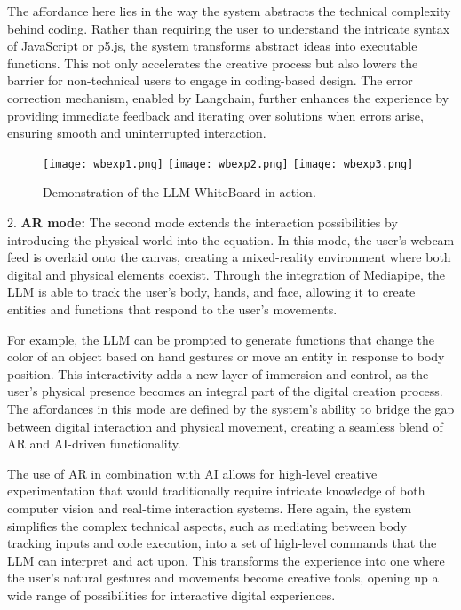 The affordance here lies in the way the system abstracts the technical complexity behind coding.
Rather than requiring the user to understand the intricate syntax of JavaScript or p5.js, the system transforms abstract ideas into executable functions.
This not only accelerates the creative process but also lowers the barrier for non-technical users to engage in coding-based design.
The error correction mechanism, enabled by Langchain, further enhances the experience by providing immediate feedback and iterating over solutions when errors arise, ensuring smooth and uninterrupted interaction.

\begin{figure}[h!]
    \centering
    \texttt{[image: wbexp1.png]}
    \texttt{[image: wbexp2.png]}
    \texttt{[image: wbexp3.png]}
    \caption{Demonstration of the LLM WhiteBoard in action.}
    \vspace{0.1cm}
    \label{fig:wbdemo1}
\end{figure}

2. \textbf{AR mode:} The second mode extends the interaction possibilities by introducing the physical world into the equation.
In this mode, the user’s webcam feed is overlaid onto the canvas, creating a mixed-reality environment where both digital and physical elements coexist.
Through the integration of Mediapipe, the LLM is able to track the user’s body, hands, and face, allowing it to create entities and functions that respond to the user’s movements.

For example, the LLM can be prompted to generate functions that change the color of an object based on hand gestures or move an entity in response to body position.
This interactivity adds a new layer of immersion and control, as the user's physical presence becomes an integral part of the digital creation process.
The affordances in this mode are defined by the system’s ability to bridge the gap between digital interaction and physical movement, creating a seamless blend of AR and AI-driven functionality.

The use of AR in combination with AI allows for high-level creative experimentation that would traditionally require intricate knowledge of both computer vision and real-time interaction systems.
Here again, the system simplifies the complex technical aspects, such as mediating between body tracking inputs and code execution, into a set of high-level commands that the LLM can interpret and act upon.
This transforms the experience into one where the user’s natural gestures and movements become creative tools, opening up a wide range of possibilities for interactive digital experiences.

